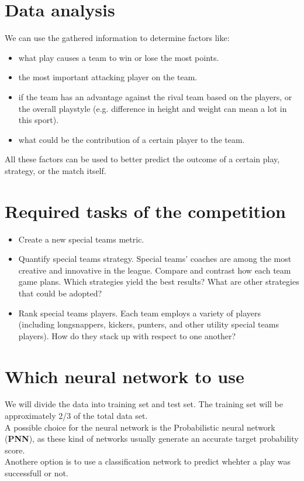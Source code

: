 \documentclass{article}
\begin{document}
\section{Data analysis}
We can use the gathered information to determine factors like:
\begin{itemize}
\item what play causes a team to win or lose the most points.
\item the most important attacking player on the team.
\item if the team has an advantage against the rival team based on the players, or the overall playstyle (e.g. difference in height and weight can mean a lot in this sport).
\item what could be the contribution of a certain player to the team.
\end{itemize}
All these factors can be used to better predict the outcome of a certain play, strategy, or the match itself.
\section{Required tasks of the competition}
\begin{itemize}
\item Create a new special teams metric.
\item Quantify special teams strategy. Special teams’ coaches are among the most creative and innovative in the league. Compare and contrast how each team game plans. Which strategies yield the best results? What are other strategies that could be adopted\cite{NFL_Kaggle}?
\item Rank special teams players. Each team employs a variety of players (including longsnappers, kickers, punters, and other utility special teams players). How do they stack up with respect to one another\cite{NFL_Kaggle}?
\end{itemize}

\section{Which neural network to use}
We will divide the data into training set and test set. The training set will be approximately 2/3 of the total data set.  \\
A possible choice for the neural network is the Probabilistic neural network (\textbf{PNN}), as these kind of networks usually generate an accurate target probability score.\\
Anothere option is to use a classification network to predict whehter a play was successfull or not.
\end{document}
